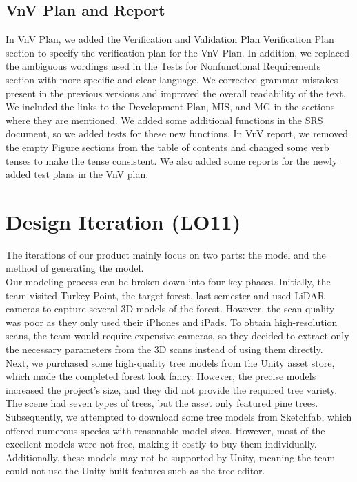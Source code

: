 \documentclass{article}
\begin{document}
\subsection{VnV Plan and Report}
In VnV Plan, we added the Verification and Validation Plan Verification Plan section to specify the verification plan for the VnV Plan. In addition, we replaced the ambiguous wordings used in the Tests for Nonfunctional Requirements section with more specific and clear language. We corrected grammar mistakes present in the previous versions and improved the overall readability of the text. We included the links to the Development Plan, MIS, and MG in the sections where they are mentioned. We added some additional functions in the SRS document, so we added tests for these new functions. In VnV report,  we removed the empty Figure sections from the table of contents and changed some verb tenses to make the tense consistent. We also added some reports for the newly added test plans in the VnV plan. 


\section{Design Iteration (LO11)}


\noindent The iterations of our product mainly focus on two parts: the model and the method of generating the model.\\

\noindent Our modeling process can be broken down into four key phases. Initially, the team visited Turkey Point, the target forest, last semester and used LiDAR cameras to capture several 3D models of the forest. However, the scan quality was poor as they only used their iPhones and iPads. To obtain high-resolution scans, the team would require expensive cameras, so they decided to extract only the necessary parameters from the 3D scans instead of using them directly.\\

\noindent Next, we purchased some high-quality tree models from the Unity asset store, which made the completed forest look fancy. However, the precise models increased the project's size, and they did not provide the required tree variety. The scene had seven types of trees, but the asset only featured pine trees.\\

\noindent Subsequently, we attempted to download some tree models from Sketchfab, which offered numerous species with reasonable model sizes. However, most of the excellent models were not free, making it costly to buy them individually. Additionally, these models may not be supported by Unity, meaning the team could not use the Unity-built features such as the tree editor.\\
\end{document}
